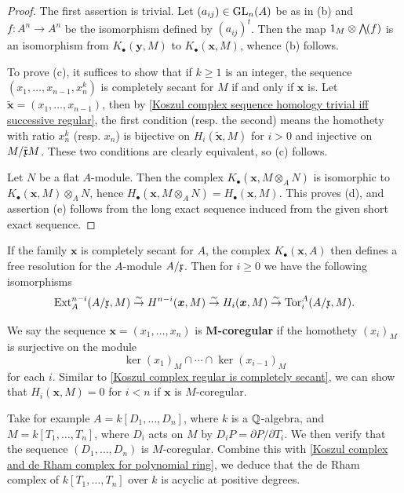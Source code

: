 \begin{proof}
The first assertion is trivial. Let $(a_{ij})\in\mathrm{GL}_n(A)$ be as in (b) and $f:A^n\to A^n$ be the isomorphism defined by $(a_{ij})^t$. Then the map $1_M\otimes\bigw(f)$ is an isomorphism from $K_\bullet(\bm{y},M)$ to $K_\bullet(\bm{x},M)$, whence (b) follows.\par
To prove (c), it suffices to show that if $k\geq 1$ is an integer, the sequence $(x_1,\dots,x_{n-1},x_n^k)$ is completely secant for $M$ if and only if $\bm{x}$ is. Let $\tilde{\bm{x}}=(x_1,\dots,x_{n-1})$, then by \cref{Koszul complex sequence homology trivial iff successive regular}, the first condition (resp. the second) means the homothety with ratio $x_n^k$ (resp. $x_n$) is bijective on $H_i(\tilde{\bm{x}},M)$ for $i>0$ and injective on $M/\tilde{\mathfrak{x}}M$. These two conditions are clearly equivalent, so (c) follows.\par
Let $N$ be a flat $A$-module. Then the complex $K_\bullet(\bm{x},M\otimes_AN)$ is isomorphic to $K_\bullet(\bm{x},M)\otimes_AN$, hence $H_\bullet(\bm{x},M\otimes_AN)=H_\bullet(\bm{x},M)$. This proves (d), and assertion (e) follows from the long exact sequence induced from the given short exact sequence.
\end{proof}
\begin{remark}\label{Koszul complex sequence completely secant is free resolution}
If the family $\bm{x}$ is completely secant for $A$, the complex $K_\bullet(\bm{x},A)$ then defines a free resolution for the $A$-module $A/\mathfrak{x}$. Then for $i\geq 0$ we have the following isomorphisms 
\begin{equation}\label{Koszul sequence completely secant for A EXt and Tor iso}
\mathrm{Ext}_A^{n-i}(A/\mathfrak{x},M)\stackrel{\sim}{\to}H^{n-i}(\bm{x},M)\stackrel{\sim}{\to}H_i(\bm{x},M)\stackrel{\sim}{\to}\mathrm{Tor}^A_i(A/\mathfrak{x},M).
\end{equation}
\end{remark}
\begin{example}
We say the sequence $\bm{x}=(x_1,\dots,x_n)$ is \textbf{$\bm{M}$-coregular} if the homothety $(x_i)_M$ is surjective on the module
\[\ker(x_1)_M\cap\cdots\cap\ker(x_{i-1})_M\]
for each $i$. Similar to \cref{Koszul complex regular is completely secant}, we can show that $H_i(\bm{x},M)=0$ for $i<n$ if $\bm{x}$ is $M$-coregular.\par
Take for example $A=k[D_1,\dots,D_n]$, where $k$ is a $\mathbb{Q}$-algebra, and $M=k[T_1,\dots,T_n]$, where $D_i$ acts on $M$ by $D_iP=\partial P/\partial T_i$. We then verify that the sequence $(D_1,\dots,D_n)$ is $M$-coregular. Combine this with \cref{Koszul complex and de Rham complex for polynomial ring}, we deduce that the de Rham complex of $k[T_1,\dots,T_n]$ over $k$ is acyclic at positive degrees.
\end{example}
